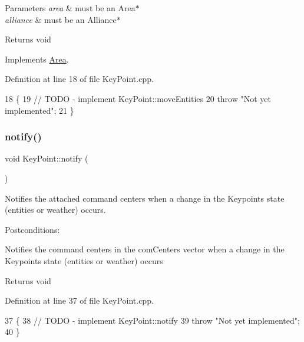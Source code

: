 \begin{DoxyParams}{Parameters}
{\em area} & must be an Area$\ast$ \\
\hline
{\em alliance} & must be an Alliance$\ast$ \\
\hline
\end{DoxyParams}
\begin{DoxyReturn}{Returns}
void 
\end{DoxyReturn}


Implements \hyperlink{classArea}{Area}.



Definition at line 18 of file Key\+Point.\+cpp.


\begin{DoxyCode}
18                                                           \{
19     \textcolor{comment}{// TODO - implement KeyPoint::moveEntities}
20     \textcolor{keywordflow}{throw} \textcolor{stringliteral}{"Not yet implemented"};
21 \}
\end{DoxyCode}
\mbox{\label{classKeyPoint_a5b21817babe753b2b684d70479f3eaf2}} 
\subsubsection{\texorpdfstring{notify()}{notify()}}
{\footnotesize\ttfamily void Key\+Point\+::notify (\begin{DoxyParamCaption}{ }\end{DoxyParamCaption})}



Notifies the attached command centers when a change in the Keypoint\textquotesingle{}s state (entities or weather) occurs. 

Postconditions\+:
\begin{DoxyItemize}
\item Notifies the command centers in the com\+Centers vector when a change in the Keypoint\textquotesingle{}s state (entities or weather) occurs
\end{DoxyItemize}

\begin{DoxyReturn}{Returns}
void 
\end{DoxyReturn}


Definition at line 37 of file Key\+Point.\+cpp.


\begin{DoxyCode}
37                       \{
38     \textcolor{comment}{// TODO - implement KeyPoint::notify}
39     \textcolor{keywordflow}{throw} \textcolor{stringliteral}{"Not yet implemented"};
40 \}
\end{DoxyCode}
\mbox{\label{classKeyPoint_a5c4b9314440a00fca7ab4d82ea4693a5}} 
